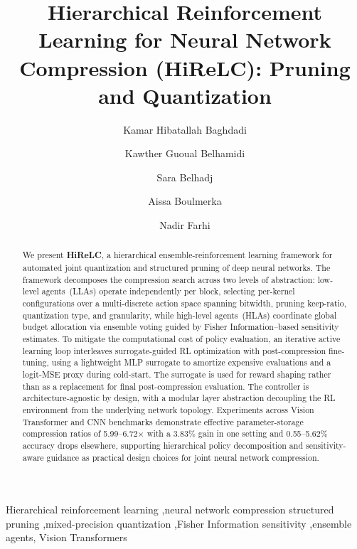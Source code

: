 \documentclass[preprint,12pt,authoryear]{elsarticle}
\begin{document}
\begin{frontmatter}

\title{Hierarchical Reinforcement Learning for Neural Network Compression (HiReLC): Pruning and Quantization}



\author[ensia]{Kamar Hibatallah Baghdadi}

\author[ensia]{Kawther Guoual Belhamidi}

\author[ensia]{Sara Belhadj}

\author[ensia]{Aissa Boulmerka}

\author[uge]{Nadir Farhi}


\address[ensia]{National School of Artificial Intelligence (ENSIA), Sidi Abdellah Campus, Algiers, Algeria}

\address[uge]{Cosys-Grettia, Univ Gustave Eiffel, F-77454 Marne-la-Vallee, France.}



\begin{abstract}
We present \textbf{HiReLC}, a hierarchical ensemble-reinforcement learning framework
for automated joint quantization and structured pruning of deep neural
networks. The framework decomposes the compression search across two levels of
abstraction: low-level agents~(LLAs) operate independently per block, selecting
per-kernel configurations over a multi-discrete action space spanning bitwidth, pruning
keep-ratio, quantization type, and granularity, while high-level agents~(HLAs)
coordinate global budget allocation via ensemble voting guided by Fisher
Information--based sensitivity estimates. To mitigate the computational cost of policy
evaluation, an iterative active learning loop interleaves surrogate-guided RL
optimization with post-compression fine-tuning, using a lightweight MLP surrogate to
amortize expensive evaluations and a logit-MSE proxy during cold-start. The surrogate is
used for reward shaping rather than as a replacement for final post-compression
evaluation. The controller is architecture-agnostic by design, with a modular layer
abstraction decoupling the RL environment from the underlying network topology. Experiments across Vision Transformer
and CNN benchmarks demonstrate effective parameter-storage compression ratios of
5.99--6.72$\times$ with a 3.83\% gain in one setting and 0.55--5.62\% accuracy drops
elsewhere, supporting hierarchical policy decomposition and sensitivity-aware guidance
as practical design choices for joint neural network compression.
\end{abstract}

\begin{keyword}
Hierarchical reinforcement learning \sep neural network compression structured pruning \sep mixed-precision quantization \sep Fisher Information sensitivity \sep ensemble agents, Vision Transformers
\end{keyword}


\end{frontmatter}
\end{document}
